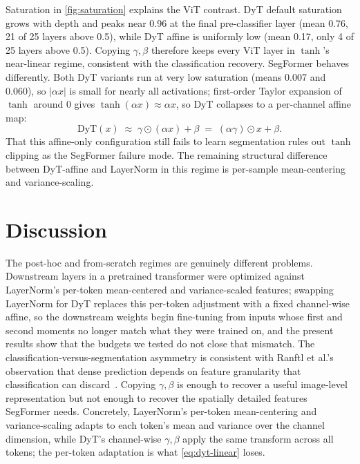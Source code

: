 \documentclass[10pt,twocolumn,letterpaper]{article}
\newcommand{\dyt}{\mathrm{DyT}}
\begin{document}
Saturation in \cref{fig:saturation} explains the ViT contrast. DyT default saturation grows with depth and peaks near 0.96 at the final pre-classifier layer (mean 0.76, 21 of 25 layers above 0.5), while DyT affine is uniformly low (mean 0.17, only 4 of 25 layers above 0.5). Copying $\gamma, \beta$ therefore keeps every ViT layer in $\tanh$'s near-linear regime, consistent with the classification recovery. SegFormer behaves differently. Both DyT variants run at very low saturation (means 0.007 and 0.060), so $|\alpha x|$ is small for nearly all activations; first-order Taylor expansion of $\tanh$ around 0 gives $\tanh(\alpha x) \approx \alpha x$, so DyT collapses to a per-channel affine map:
\begin{equation}
    \dyt(x) \;\approx\; \gamma \odot (\alpha x) + \beta \;=\; (\alpha \gamma) \odot x + \beta .
    \label{eq:dyt-linear}
\end{equation}
That this affine-only configuration still fails to learn segmentation rules out $\tanh$ clipping as the SegFormer failure mode. The remaining structural difference between DyT-affine and LayerNorm in this regime is per-sample mean-centering and variance-scaling.

\section{Discussion}
\label{sec:discussion}

The post-hoc and from-scratch regimes are genuinely different problems. Downstream layers in a pretrained transformer were optimized against LayerNorm's per-token mean-centered and variance-scaled features; swapping LayerNorm for DyT replaces this per-token adjustment with a fixed channel-wise affine, so the downstream weights begin fine-tuning from inputs whose first and second moments no longer match what they were trained on, and the present results show that the budgets we tested do not close that mismatch. The classification-versus-segmentation asymmetry is consistent with Ranftl et al.'s observation that dense prediction depends on feature granularity that classification can discard~\cite{ranftl2021dpt}. Copying $\gamma, \beta$ is enough to recover a useful image-level representation but not enough to recover the spatially detailed features SegFormer needs. Concretely, LayerNorm's per-token mean-centering and variance-scaling adapts to each token's mean and variance over the channel dimension, while DyT's channel-wise $\gamma, \beta$ apply the same transform across all tokens; the per-token adaptation is what \cref{eq:dyt-linear} loses.
\end{document}
